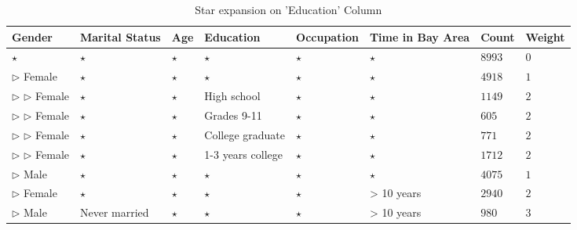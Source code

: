 \begin{table} 
\centering 
\begin{tabular}{| p{1.5cm} | p{1.5cm} | p{1.5cm} | p{1.5cm} | p{1.5cm} | p{1.5cm} | l | l |} 
\hline Gender & Marital Status & Age & Education & Occupation & Time in Bay Area & Count & Weight \\ \hline 
\cline{1-8} $\star$ & $\star$ & $\star$ & $\star$ & $\star$ & $\star$ & $8993$ & $0$ \\
\cline{1-1} \cline{2-2} \cline{3-3} \cline{4-4} \cline{5-5} \cline{6-6} \cline{7-8} $\triangleright$ Female & $\star$ & $\star$ & $\star$ & $\star$ & $\star$ & $4918$ & $1$ \\
\cline{2-2} \cline{3-3} \cline{4-4} \cline{5-5} \cline{6-6} \cline{7-8} $\triangleright$ $\triangleright$ Female & $\star$ & $\star$ & High school & $\star$ & $\star$ & $1149$ & $2$ \\
\cline{2-2} \cline{3-3} \cline{4-4} \cline{5-5} \cline{6-6} \cline{7-8} $\triangleright$ $\triangleright$ Female & $\star$ & $\star$ & Grades 9-11 & $\star$ & $\star$ & $605$ & $2$ \\
\cline{2-2} \cline{3-3} \cline{4-4} \cline{5-5} \cline{6-6} \cline{7-8} $\triangleright$ $\triangleright$ Female & $\star$ & $\star$ & College graduate & $\star$ & $\star$ & $771$ & $2$ \\
\cline{2-2} \cline{3-3} \cline{4-4} \cline{5-5} \cline{6-6} \cline{7-8} $\triangleright$ $\triangleright$ Female & $\star$ & $\star$ & 1-3 years college & $\star$ & $\star$ & $1712$ & $2$ \\
\cline{1-1} \cline{2-2} \cline{3-3} \cline{4-4} \cline{5-5} \cline{6-6} \cline{7-8} $\triangleright$ Male & $\star$ & $\star$ & $\star$ & $\star$ & $\star$ & $4075$ & $1$ \\
\cline{1-1} \cline{2-2} \cline{3-3} \cline{4-4} \cline{5-5} \cline{6-6} \cline{7-8} $\triangleright$ Female & $\star$ & $\star$ & $\star$ & $\star$ & > 10 years & $2940$ & $2$ \\
\cline{1-1} \cline{2-2} \cline{3-3} \cline{4-4} \cline{5-5} \cline{6-6} \cline{7-8} $\triangleright$ Male & Never married & $\star$ & $\star$ & $\star$ & > 10 years & $980$ & $3$ \\
\hline 
\end{tabular} 
\caption{Star expansion on 'Education' Column \label{table:uiexamplestar}} 
\end{table} 


